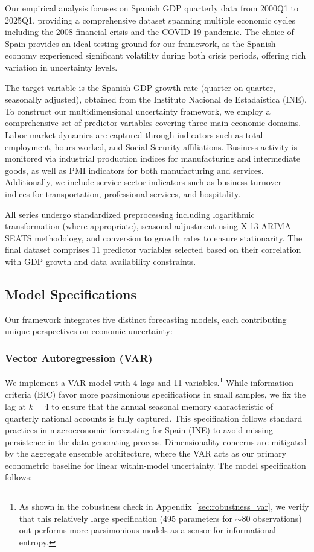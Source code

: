 \documentclass[12pt,a4paper]{article}
\theoremstyle{remark}
\begin{document}
Our empirical analysis focuses on Spanish GDP quarterly data from 2000Q1 to 2025Q1, providing a comprehensive dataset spanning multiple economic cycles including the 2008 financial crisis and the COVID-19 pandemic. The choice of Spain provides an ideal testing ground for our framework, as the Spanish economy experienced significant volatility during both crisis periods, offering rich variation in uncertainty levels.

The target variable is the Spanish GDP growth rate (quarter-on-quarter, seasonally adjusted), obtained from the Instituto Nacional de Estadaística (INE). To construct our multidimensional uncertainty framework, we employ a comprehensive set of predictor variables covering three main economic domains. Labor market dynamics are captured through indicators such as total employment, hours worked, and Social Security affiliations. Business activity is monitored via industrial production indices for manufacturing and intermediate goods, as well as PMI indicators for both manufacturing and services. Additionally, we include service sector indicators such as business turnover indices for transportation, professional services, and hospitality.

All series undergo standardized preprocessing including logarithmic transformation (where appropriate), seasonal adjustment using X-13 ARIMA-SEATS methodology, and conversion to growth rates to ensure stationarity. The final dataset comprises 11 predictor variables selected based on their correlation with GDP growth and data availability constraints.

\subsection{Model Specifications}

Our framework integrates five distinct forecasting models, each contributing unique perspectives on economic uncertainty:

\subsubsection{Vector Autoregression (VAR)}
We implement a VAR model with 4 lags and 11 variables.\footnote{As shown in the robustness check in Appendix~\ref{sec:robustness_var}, we verify that this relatively large specification (495 parameters for $\sim$80 observations) out-performs more parsimonious models as a sensor for informational entropy.} While information criteria (BIC) favor more parsimonious specifications in small samples, we fix the lag at $k=4$ to ensure that the annual seasonal memory characteristic of quarterly national accounts is fully captured. This specification follows standard practices in macroeconomic forecasting for Spain (INE) to avoid missing persistence in the data-generating process. Dimensionality concerns are mitigated by the aggregate ensemble architecture, where the VAR acts as our primary econometric baseline for linear within-model uncertainty. The model specification follows:
\end{document}
